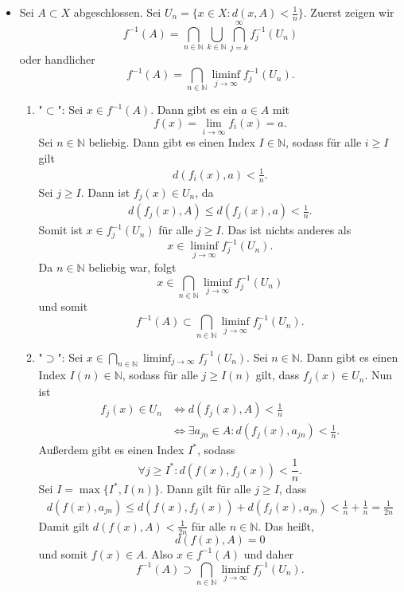\documentclass{article}
\begin{document}
\begin{itemize}
    \item Sei $A\subset X$ abgeschlossen. Sei $U_n = \{ x \in X: d(x,A) < \frac{1}{n}\}$. Zuerst zeigen wir 
    $$
        f^{-1}(A) = \bigcap_{n \in \mathbb N} \bigcup_{k \in \mathbb N} \bigcap_{j=k}^\infty f_j^{-1}(U_n)
    $$
    oder handlicher
    $$
        f^{-1}(A) = \bigcap_{n \in \mathbb N}\liminf_{j \to \infty}f_j^{-1}(U_n).
    $$
    
    \begin{enumerate}
        \item "$\subset$": Sei $x \in f^{-1}(A)$. Dann gibt es ein $a \in A$ mit 
        $$
            f(x) = \lim_{i \to \infty} f_i(x) = a.
        $$ 
        Sei $n \in \mathbb N$ beliebig. Dann gibt es einen Index $I \in \mathbb N$, sodass für alle $i \geq I$ gilt 
        \begin{align*}
            d(f_i(x), a) < \frac{1}{n}.
        \end{align*}
        Sei $j \geq I$. Dann ist $f_j(x) \in U_n$, da 
        \begin{align*}
            d(f_j(x), A) \leq d(f_j(x), a) < \frac{1}{n}.
        \end{align*}
        Somit ist $x \in f_j^{-1}(U_n)$ für alle $j \geq I$. Das ist nichts anderes als 
        $$
            x \in \liminf_{j \to \infty} f^{-1}_j(U_n).
        $$
        Da $n \in \mathbb N$ beliebig war, folgt 
        $$
            x \in \bigcap_{n \in \mathbb N} \liminf_{j \to \infty} f^{-1}_j(U_n)
        $$
        und somit 
        $$  
            f^{-1}(A) \subset \bigcap_{n \in \mathbb N} \liminf_{j \to \infty} f^{-1}_j(U_n).
        $$

        \item "$\supset$": Sei $x \in \bigcap_{n \in \mathbb N} \liminf_{j \to \infty}f^{-1}_j(U_n)$. Sei $n \in \mathbb N$. Dann gibt es einen Index $I(n) \in \mathbb N$, sodass für alle $j \geq I(n)$ gilt, dass $f_j(x) \in U_n$. Nun ist 
        \begin{align*}
            f_j(x) \in U_n &\iff d(f_j(x), A)< \frac{1}{n}\\ &\iff \exists a_{jn} \in A: d(f_j(x), a_{jn}) < \frac{1}{n}.
        \end{align*}            
        Außerdem gibt es einen Index $I^*$, sodass 
        $$
            \forall j \geq I^*: d(f(x), f_j(x)) < \frac{1}{n}.
        $$
        Sei $I = \max\{ I^*, I(n) \}$. Dann gilt für alle $j \geq I$, dass 
        \begin{align*}
            d(f(x), a_{jn}) \leq d(f(x), f_j(x)) + d(f_j(x), a_{jn}) < \frac{1}{n} + \frac{1}{n} = \frac{1}{2n}
        \end{align*}
        Damit gilt $d(f(x), A) < \frac{1}{2n}$ für alle $n \in \mathbb N$. Das heißt, 
        $$
            d(f(x), A) = 0
        $$
        und somit $f(x) \in A$. Also $x\in f^{-1}(A)$ und daher 
        $$  
            f^{-1}(A) \supset \bigcap_{n \in \mathbb N} \liminf_{j \to \infty} f^{-1}_j(U_n).
        $$
    \end{enumerate}


\end{itemize}
\end{document}
